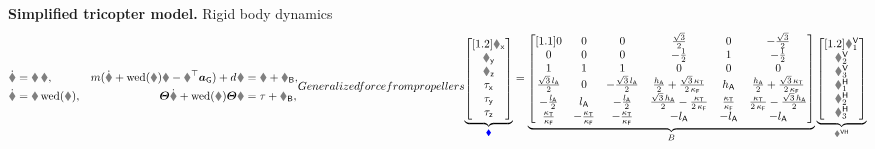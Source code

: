 \begin{RedBox}
\textbf{Simplified tricopter model.}
Rigid body dynamics
\begin{subequations}\label{eq:TricopterSimpModel}
\begin{align}
 \rd &= \R\, \v,&
 \m(\vd + \wedOp(\w)\v - \RT \gravityAcc) + \bodyDamping{}{} \v &= \F + \FB,
\\
 \Rd &= \R \wedOp(\w),&
 \J \dot{\w} + \wedOp(\w) \J \w &= \tau + \tauB,
\end{align}
Generalized force from propellers
\begin{align}\label{eq:TriActuatorTrafo}
 \underbrace{\begin{bmatrix}[1.2] \Fx \\ \Fy \\ \Fz \\ \taux \\ \tauy \\ \tauz \end{bmatrix}}_{\genForce}
 =
 \underbrace{\begin{bmatrix}[1.1] 
  0 & 0 & 0 & \tfrac{\sqrt{3}}{2} & 0 & -\tfrac{\sqrt{3}}{2} \\
  0 & 0 & 0 & -\tfrac{1}{2} & 1 & -\tfrac{1}{2} \\
  1 & 1 & 1 & 0 & 0 & 0 \\
   \tfrac{\sqrt{3}\,\ArmRadius}{2} & 0 & -\tfrac{\sqrt{3}\,\ArmRadius}{2} & \tfrac{\ArmHeight}{2} + \tfrac{\sqrt{3}\,\kappaT}{2\,\kappaF} & \ArmHeight & \tfrac{\ArmHeight}{2} + \tfrac{\sqrt{3}\,\kappaT}{2\,\kappaF} \\
  -\tfrac{\ArmRadius}{2} & \ArmRadius & -\tfrac{\ArmRadius}{2} & \tfrac{\sqrt{3}\,\ArmHeight}{2} - \tfrac{\kappaT}{2\,\kappaF} & \tfrac{\kappaT}{\kappaF} & \tfrac{\kappaT}{2\,\kappaF} - \tfrac{\sqrt{3}\,\ArmHeight}{2} \\
  \tfrac{\kappaT}{\kappaF} & -\tfrac{\kappaT}{\kappaF} & -\tfrac{\kappaT}{\kappaF} & -\ArmRadius & -\ArmRadius & -\ArmRadius
 \end{bmatrix}}_{B}
 \underbrace{\begin{bmatrix}[1.2] \F^{\mathsf{V}}_1 \\ \F^{\mathsf{V}}_2 \\ \F^{\mathsf{V}}_3 \\ \F^{\mathsf{H}}_1 \\ \F^{\mathsf{H}}_2 \\ \F^{\mathsf{H}}_3 \end{bmatrix}}_{\F^\mathsf{VH}}
\\

\end{align}
\end{subequations}
\end{RedBox}
